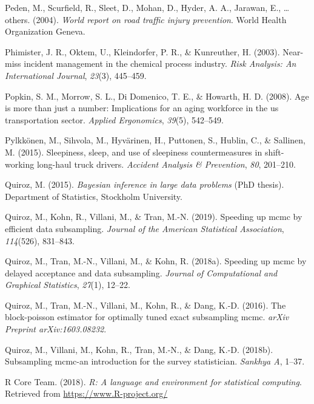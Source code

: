 \documentclass[12pt]{book}
\numberwithin{equation}{chapter}
\begin{document}
\leavevmode\hypertarget{ref-peden2004world}{}%
Peden, M., Scurfield, R., Sleet, D., Mohan, D., Hyder, A. A., Jarawan, E., \ldots{} others. (2004). \emph{World report on road traffic injury prevention}. World Health Organization Geneva.

\leavevmode\hypertarget{ref-phimister2003near}{}%
Phimister, J. R., Oktem, U., Kleindorfer, P. R., \& Kunreuther, H. (2003). Near-miss incident management in the chemical process industry. \emph{Risk Analysis: An International Journal}, \emph{23}(3), 445--459.

\leavevmode\hypertarget{ref-popkin2008age}{}%
Popkin, S. M., Morrow, S. L., Di Domenico, T. E., \& Howarth, H. D. (2008). Age is more than just a number: Implications for an aging workforce in the us transportation sector. \emph{Applied Ergonomics}, \emph{39}(5), 542--549.

\leavevmode\hypertarget{ref-pylkkonen2015sleepiness}{}%
Pylkkönen, M., Sihvola, M., Hyvärinen, H., Puttonen, S., Hublin, C., \& Sallinen, M. (2015). Sleepiness, sleep, and use of sleepiness countermeasures in shift-working long-haul truck drivers. \emph{Accident Analysis \& Prevention}, \emph{80}, 201--210.

\leavevmode\hypertarget{ref-quiroz2015bayesian}{}%
Quiroz, M. (2015). \emph{Bayesian inference in large data problems} (PhD thesis). Department of Statistics, Stockholm University.

\leavevmode\hypertarget{ref-quiroz2019speeding}{}%
Quiroz, M., Kohn, R., Villani, M., \& Tran, M.-N. (2019). Speeding up mcmc by efficient data subsampling. \emph{Journal of the American Statistical Association}, \emph{114}(526), 831--843.

\leavevmode\hypertarget{ref-quiroz2018speeding}{}%
Quiroz, M., Tran, M.-N., Villani, M., \& Kohn, R. (2018a). Speeding up mcmc by delayed acceptance and data subsampling. \emph{Journal of Computational and Graphical Statistics}, \emph{27}(1), 12--22.

\leavevmode\hypertarget{ref-quiroz2016block}{}%
Quiroz, M., Tran, M.-N., Villani, M., Kohn, R., \& Dang, K.-D. (2016). The block-poisson estimator for optimally tuned exact subsampling mcmc. \emph{arXiv Preprint arXiv:1603.08232}.

\leavevmode\hypertarget{ref-quiroz2018subsampling}{}%
Quiroz, M., Villani, M., Kohn, R., Tran, M.-N., \& Dang, K.-D. (2018b). Subsampling mcmc-an introduction for the survey statistician. \emph{Sankhya A}, 1--37.

\leavevmode\hypertarget{ref-Rcitation}{}%
R Core Team. (2018). \emph{R: A language and environment for statistical computing}. Retrieved from \url{https://www.R-project.org/}
\end{document}
